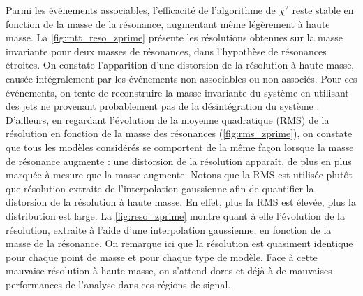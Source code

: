 Parmi les événements associables, l'efficacité de l'algorithme de $\chi^2$ reste stable en fonction de la masse de la résonance, augmentant même légèrement à haute masse. La \cref{fig:mtt_reso_zprime} présente les résolutions obtenues sur la masse invariante pour deux masses de résonances, dans l'hypothèse de résonances étroites. On constate l'apparition d'une distorsion de la résolution à haute masse, causée intégralement par les événements non-associables ou non-associés. Pour ces événements, on tente de reconstruire la masse invariante du système \ttbar en utilisant des jets ne provenant probablement pas de la désintégration du système \ttbar. D'ailleurs, en regardant l'évolution de la moyenne quadratique (RMS) de la résolution en fonction de la masse des résonances (\cref{fig:rms_zprime}), on constate que tous les modèles considérés se comportent de la même façon lorsque la masse de résonance augmente : une distorsion de la résolution apparaît, de plus en plus marquée à mesure que la masse augmente. Notons que la RMS est utilisée plutôt que résolution extraite de l'interpolation gaussienne afin de quantifier la distorsion de la résolution à haute masse. En effet, plus la RMS est élevée, plus la distribution est large. La \cref{fig:reso_zprime} montre quant à elle l'évolution de la résolution, extraite à l'aide d'une interpolation gaussienne, en fonction de la masse de la résonance. On remarque ici que la résolution est quasiment identique pour chaque point de masse et pour chaque type de modèle. Face à cette mauvaise résolution à haute masse, on s'attend dores et déjà à de mauvaises performances de l'analyse dans ces régions de signal.

